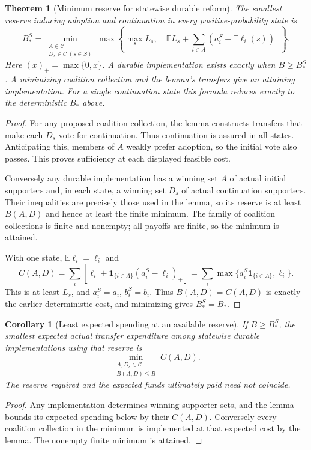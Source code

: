 \documentclass[11pt]{article}
\newtheorem{theorem}{Theorem}
\newtheorem{corollary}{Corollary}
\theoremstyle{definition}
\begin{document}
\begin{theorem}[Minimum reserve for statewise durable reform]
The smallest reserve inducing adoption and continuation in every
positive-probability state is
\[
 B_*^S=
 \min_{\substack{A\in\mathcal C\\D_s\in\mathcal C\ (s\in S)}}
 \max\left\{\max_s L_s,\quad
     \mathbb E L_s+\sum_{i\in A}
           (a_i^S-\mathbb E\ell_i(s))_+\right\}.
\]
Here $(x)_+=\max\{0,x\}$. A durable implementation exists exactly
when $B\geq B_*^S$. A minimizing coalition collection and the lemma's
transfers give an attaining implementation. For a single continuation
state this formula reduces exactly to the deterministic $B_*$ above.
\end{theorem}
\begin{proof}
For any proposed coalition collection, the lemma constructs transfers
that make each $D_s$ vote for continuation. Thus continuation is
assured in all states. Anticipating this, members of $A$ weakly prefer
adoption, so the initial vote also passes. This proves sufficiency at
each displayed feasible cost.

Conversely any durable implementation has a winning set $A$ of actual
initial supporters and, in each state, a winning set $D_s$ of actual
continuation supporters. Their inequalities are precisely those used
in the lemma, so its reserve is at least $B(A,D)$ and hence at least
the finite minimum. The family of coalition collections is finite and
nonempty; all payoffs are finite, so the minimum is attained.

With one state, $\mathbb E\ell_i=\ell_i$ and
\[
 C(A,D)=\sum_i\left[\ell_i+
           \mathbf1_{\{i\in A\}}(a_i^S-\ell_i)_+\right]
       =\sum_i\max\{a_i^S\mathbf1_{\{i\in A\}},\ell_i\}.
\]
This is at least $L_s$, and $a_i^S=a_i$, $b_i^S=b_i$.
Thus $B(A,D)=C(A,D)$ is exactly the earlier deterministic cost, and
minimizing gives $B_*^S=B_*$.
\end{proof}

\begin{corollary}[Least expected spending at an available reserve]
If $B\geq B_*^S$, the smallest expected actual transfer expenditure
among statewise durable implementations using that reserve is
\[
 \min_{\substack{A,D_s\in\mathcal C\\B(A,D)\leq B}} C(A,D).
\]
The reserve required and the expected funds ultimately paid need not
coincide.
\end{corollary}
\begin{proof}
Any implementation determines winning supporter sets, and the lemma
bounds its expected spending below by their $C(A,D)$. Conversely every
coalition collection in the minimum is implemented at that expected
cost by the lemma. The nonempty finite minimum is attained.
\end{proof}
\end{document}
